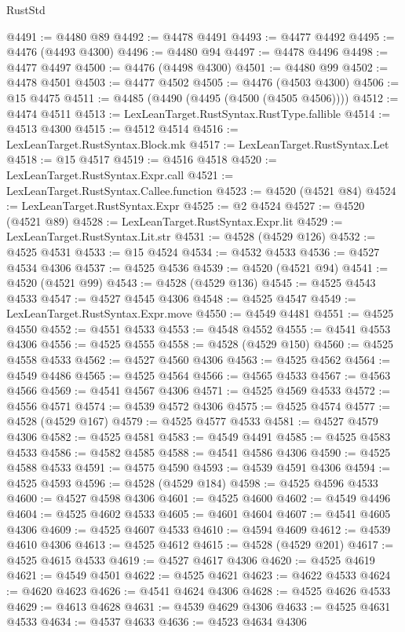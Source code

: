 \begin{lexlean}{RustStd}
\begin{coremodule}
{\begin{coremodule}
{{{{{{{{{{{{{{{{{{{{{{{{{{{{{{{{{{{{{{{{{{{{{{{{{{{{{{{{{{{{@4491 := @4480 @89
@4492 := @4478 @4491
@4493 := @4477 @4492
@4495 := @4476 (@4493 @4300)
@4496 := @4480 @94
@4497 := @4478 @4496
@4498 := @4477 @4497
@4500 := @4476 (@4498 @4300)
@4501 := @4480 @99
@4502 := @4478 @4501
@4503 := @4477 @4502
@4505 := @4476 (@4503 @4300)
@4506 := @15 @4475
@4511 := @4485 (@4490 (@4495 (@4500 (@4505 @4506))))
@4512 := @4474 @4511
@4513 := LexLeanTarget.RustSyntax.RustType.fallible
@4514 := @4513 @4300
@4515 := @4512 @4514
@4516 := LexLeanTarget.RustSyntax.Block.mk
@4517 := LexLeanTarget.RustSyntax.Let
@4518 := @15 @4517
@4519 := @4516 @4518
@4520 := LexLeanTarget.RustSyntax.Expr.call
@4521 := LexLeanTarget.RustSyntax.Callee.function
@4523 := @4520 (@4521 @84)
@4524 := LexLeanTarget.RustSyntax.Expr
@4525 := @2 @4524
@4527 := @4520 (@4521 @89)
@4528 := LexLeanTarget.RustSyntax.Expr.lit
@4529 := LexLeanTarget.RustSyntax.Lit.str
@4531 := @4528 (@4529 @126)
@4532 := @4525 @4531
@4533 := @15 @4524
@4534 := @4532 @4533
@4536 := @4527 @4534 @4306
@4537 := @4525 @4536
@4539 := @4520 (@4521 @94)
@4541 := @4520 (@4521 @99)
@4543 := @4528 (@4529 @136)
@4545 := @4525 @4543 @4533
@4547 := @4527 @4545 @4306
@4548 := @4525 @4547
@4549 := LexLeanTarget.RustSyntax.Expr.move
@4550 := @4549 @4481
@4551 := @4525 @4550
@4552 := @4551 @4533
@4553 := @4548 @4552
@4555 := @4541 @4553 @4306
@4556 := @4525 @4555
@4558 := @4528 (@4529 @150)
@4560 := @4525 @4558 @4533
@4562 := @4527 @4560 @4306
@4563 := @4525 @4562
@4564 := @4549 @4486
@4565 := @4525 @4564
@4566 := @4565 @4533
@4567 := @4563 @4566
@4569 := @4541 @4567 @4306
@4571 := @4525 @4569 @4533
@4572 := @4556 @4571
@4574 := @4539 @4572 @4306
@4575 := @4525 @4574
@4577 := @4528 (@4529 @167)
@4579 := @4525 @4577 @4533
@4581 := @4527 @4579 @4306
@4582 := @4525 @4581
@4583 := @4549 @4491
@4585 := @4525 @4583 @4533
@4586 := @4582 @4585
@4588 := @4541 @4586 @4306
@4590 := @4525 @4588 @4533
@4591 := @4575 @4590
@4593 := @4539 @4591 @4306
@4594 := @4525 @4593
@4596 := @4528 (@4529 @184)
@4598 := @4525 @4596 @4533
@4600 := @4527 @4598 @4306
@4601 := @4525 @4600
@4602 := @4549 @4496
@4604 := @4525 @4602 @4533
@4605 := @4601 @4604
@4607 := @4541 @4605 @4306
@4609 := @4525 @4607 @4533
@4610 := @4594 @4609
@4612 := @4539 @4610 @4306
@4613 := @4525 @4612
@4615 := @4528 (@4529 @201)
@4617 := @4525 @4615 @4533
@4619 := @4527 @4617 @4306
@4620 := @4525 @4619
@4621 := @4549 @4501
@4622 := @4525 @4621
@4623 := @4622 @4533
@4624 := @4620 @4623
@4626 := @4541 @4624 @4306
@4628 := @4525 @4626 @4533
@4629 := @4613 @4628
@4631 := @4539 @4629 @4306
@4633 := @4525 @4631 @4533
@4634 := @4537 @4633
@4636 := @4523 @4634 @4306
}}}}}}}}}}}}}}}}}}}}}}}}}}}}}}}}}}}}}}}}}}}}}}}}}}}}}}}}}}}}
\end{coremodule}}
\end{coremodule}
\end{lexlean}
